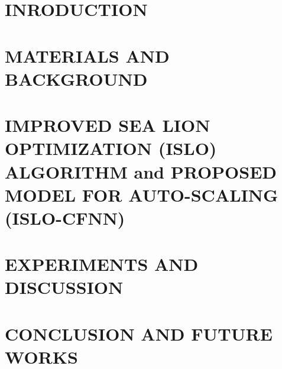 \documentclass[a4paper,13pt,3p]{report}
\begin{document}
\chapter{INRODUCTION}
\label{ch:introduction}

\newpage
\chapter{MATERIALS AND BACKGROUND}
\label{ch:background}



\newpage
\chapter{IMPROVED SEA LION OPTIMIZATION (ISLO) ALGORITHM and PROPOSED MODEL FOR AUTO-SCALING (ISLO-CFNN)}
\label{ch:improvements}


\newpage
\chapter{EXPERIMENTS AND DISCUSSION}
\label{ch:experiments}


\newpage
\chapter{CONCLUSION AND FUTURE WORKS}
\label{ch:conclusion}



\newpage
{}
\renewcommand\bibname{REFERENCES}
\printbibliography
\end{document}
